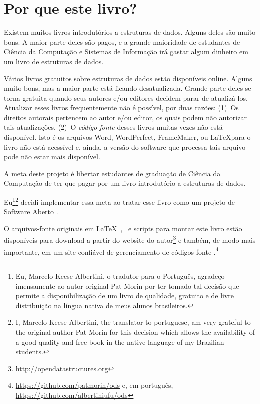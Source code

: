\chapter*{Por que este livro?}

Existem muitos livros introdutórios a estruturas de dados.
Alguns deles são muito bons. A maior parte deles são pagos, e a 
grande maioridade de estudantes de Ciência da Computação e Sistemas de 
Informação irá gastar algum dinheiro em um livro de estruturas de dados.

Vários livros gratuitos sobre estruturas de dados estão disponíveis online.
Alguns muito bons, mas a maior parte está ficando desatualizada. Grande
parte deles se torna gratuita quando seus autores e/ou editores decidem
parar de atualizá-los. Atualizar esses livros frequentemente não é possível,
por duas razões: (1)~Os direitos autorais pertencem ao autor e/ou editor,
os quais podem não autorizar tais atualizações. (2)~O \emph{código-fonte} desses
livros muitas vezes não está disponível. Isto é os arquivos Word, WordPerfect, 
FrameMaker, ou \LaTeX para o livro não está acessível e, ainda, a versão do
software que processa tais arquivo pode não estar mais disponível.

A meta deste projeto é libertar estudantes de graduação de Ciência da Computação
de ter que pagar por um livro introdutório a estruturas de dados.

Eu\footnote{Eu, Marcelo Keese Albertini, o tradutor para o Português, agradeço imensamente ao autor original Pat Morin por ter tomado tal decisão que permite a disponibilização de um livro de qualidade, gratuito e de livre distribuição na língua nativa de meus alunos brasileiros.}\footnote{I, Marcelo Keese Albertini, the translator to portuguese, am very grateful to the original author Pat Morin for this decision which allows the availability of a good quality and free book in the
native language of my Brazilian students.} decidi implementar essa meta ao tratar esse livro como um projeto de Software Aberto
%
%
.

O arquivos-fonte originais em \LaTeX\ , \lang\ e scripts para montar este livro estão disponíveis para download a partir do website do autor\footnote{\url{http://opendatastructures.org}}
e também, de modo mais importante, em um site confiável de gerenciamento de códigos-fonte
.\footnote{\url{https://github.com/patmorin/ods} e, em português, \url{https://github.com/albertiniufu/ods}}

